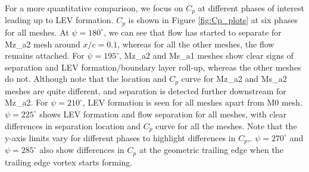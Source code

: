 For a more quantitative comparison, we focus on $C_p$  at different phases of interest leading up to LEV formation. $C_p$ is shown in Figure \ref{fig:Cp_plots} at six phases for all meshes. At $\psi=180^\circ$, we can see that flow has started to separate for Mz\_a2 mesh around $x/c=0.1$, whereas for all the other meshes, the flow remains attached. For $\psi=195^\circ$, Mz\_a2 and Ms\_a1 meshes show clear signs of separation and LEV formation/boundary layer roll-up, whereas the other meshes do not. Although note that the location and $C_p$ curve for Mz\_a2 and Ms\_a2 meshes are quite different, and separation is detected further downstream for Mz\_a2. For $\psi=210^\circ$, LEV formation is seen for all meshes 
apart from M0 mesh. $\psi=225^\circ$ shows LEV formation and flow separation for all meshes, with clear differences in separation location and $C_p$ curve for all the meshes. Note that the y-axis limits vary for different phases to highlight differences in $C_p$,.
$\psi=270^\circ$ and $\psi=285^\circ$ also show differences in $C_p$ at the geometric trailing edge when the trailing edge vortex starts forming. 


